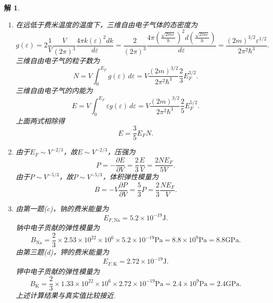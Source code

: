 \documentclass[UTF8,10pt,a4paper]{article}
\theoremstyle{Problem}
\theoremstyle{Solution}
\newtheorem*{sol}{解}
\begin{document}
\begin{sol}
    \begin{enumerate}
        \item[(a)] 在远低于费米温度的温度下，三维自由电子气体的态密度为
        \begin{equation}
            g(\varepsilon)=2\frac{1}{V}\frac{V}{(2\pi)^3}\frac{4\pi k(\varepsilon)^2dk}{d\varepsilon}=\frac{2}{(2\pi)^3}\frac{4\pi\left(\frac{\sqrt{2m\varepsilon}}{\hbar}\right)^2d\left(\frac{\sqrt{2m\varepsilon}}{\hbar}\right)}{d\varepsilon}=\frac{(2m)^{3/2}\varepsilon^{1/2}}{2\pi^2\hbar^3}.
        \end{equation}
        三维自由电子气的粒子数为
        \begin{equation}
            N=V\int_0^{E_F}g(\varepsilon)\,d\varepsilon=V\frac{(2m)^{3/2}}{2\pi^2\hbar^3}\frac{2}{3}E_F^{3/2}.
        \end{equation}
        三维自由电子气的内能为
        \begin{equation}
            E=V\int_0^{E_F}\varepsilon g(\varepsilon)\,d\varepsilon=V\frac{(2m)^{3/2}}{2\pi^2\hbar^3}\frac{2}{5}E_F^{5/2}.
        \end{equation}
        上面两式相除得
        \begin{equation}
            E=\frac{3}{5}E_FN.
        \end{equation}
        \item[(b)] 由于$E_F\sim V^{-2/3}$，故$E\sim V^{-2/3}$，压强为
        \begin{equation}
            P=-\frac{\partial E}{\partial V}=\frac{2}{3}\frac{E}{V}=\frac{2NE_F}{5V}.
        \end{equation}
        由于$P\sim V^{-5/3}$，故$P\sim V^{-5/3}$，体积弹性模量为
        \begin{equation}
            B=-V\frac{\partial P}{\partial V}=\frac{5}{3}P=\frac{2}{3}\frac{NE_F}{V}.
        \end{equation}
        \item[(c)] 由第一题(c)，钠的费米能量为
        \begin{equation}
            E_{F,\text{Na}}=5.2\times 10^{-19}\text{J}.
        \end{equation}
        钠中电子贡献的弹性模量为
        \begin{equation}
            B_{\text{Na}}=\frac{2}{3}\times 2.53\times 10^{22}\times 10^6\times 5.2\times 10^{-19}\text{Pa}=8.8\times 10^9\text{Pa}=8.8\text{GPa}.
        \end{equation}
        由第三题(d)，钾的费米能量为
        \begin{equation}
            E_{F,\text{K}}=2.72\times 10^{-19}\text{J}.
        \end{equation}
        钾中电子贡献的弹性模量为
        \begin{equation}
            B_{\text{K}}=\frac{2}{3}\times 1.33\times 10^{22}\times 10^6\times 2.72\times 10^{-19}\text{Pa}=2.4\times 10^9\text{Pa}=2.4\text{GPa}.
        \end{equation}
        上述计算结果与真实值比较接近.
    \end{enumerate}
\end{sol}
\end{document}
